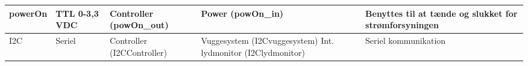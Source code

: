 \begin{center}
\begin{longtable}{|p{}|p{}|p{}|p{}|p{3cm}|}
powerOn			
&TTL 0-3,3 VDC				
&Controller \newline (powOn\_out) 			
&Power \newline (powOn\_in)	
&Benyttes til at tænde og slukket for strømforsyningen   				\\\hline

I2C			
&Seriel				
&Controller \newline (I2CController) 			
&Vuggesystem \newline (I2Cvuggesystem) \newline
 Int. lydmonitor \newline (I2Clydmonitor)	
&Seriel kommunikation
\\\hline

\end{longtable}
\end{center}